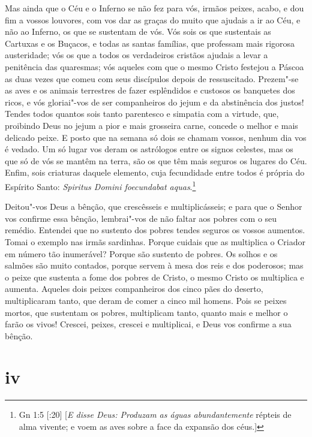 Mas ainda que o Céu e o Inferno se não fez para vós, irmãos peixes,
acabo, e dou fim a vossos louvores, com vos dar as graças do muito que
ajudais a ir ao Céu, e não ao Inferno, os que se sustentam de vós. Vós
sois os que sustentais as Cartuxas e os Buçacos, e todas as santas
famílias, que professam mais rigorosa austeridade; vós os que a todos os
verdadeiros cristãos ajudais a levar a penitência das quaresmas; vós
aqueles com que o mesmo Cristo festejou a Páscoa as duas vezes que comeu
com seus discípulos depois de ressuscitado. Prezem"-se as aves e os
animais terrestres de fazer esplêndidos e custosos os banquetes dos
ricos, e vós gloriai"-vos de ser companheiros do jejum e da abstinência
dos justos! Tendes todos quantos sois tanto parentesco e simpatia com a
virtude, que, proibindo Deus no jejum a pior e mais grosseira carne,
concede o melhor e mais delicado peixe. E posto que na semana só dois se
chamam vossos, nenhum dia vos é vedado. Um só lugar vos deram os
astrólogos entre os signos celestes, mas os que só de vós se mantêm na
terra, são os que têm mais seguros os lugares do Céu. Enfim, sois
criaturas daquele elemento, cuja fecundidade entre todos é própria do
Espírito Santo: \emph{Spiritus Domini foecundabat aquas}.\footnote{Gn 1:5 [:20] [\emph{E disse Deus: Produzam as águas abundantemente} répteis de alma vivente; e voem
as aves sobre a face da expansão dos céus.]}

Deitou"-vos Deus a bênção, que crescêsseis e multiplicásseis; e para que
o Senhor vos confirme essa bênção, lembrai"-vos de não faltar aos pobres
com o seu remédio. Entendei que no sustento dos pobres tendes seguros os
vossos aumentos. Tomai o exemplo nas irmãs sardinhas. Porque cuidais que
as multiplica o Criador em número tão inumerável? Porque são sustento de
pobres. Os solhos e os salmões são muito contados, porque servem à mesa
dos reis e dos poderosos; mas o peixe que sustenta a fome dos pobres de
Cristo, o mesmo Cristo os multiplica e aumenta. Aqueles dois peixes
companheiros dos cinco pães do deserto, multiplicaram tanto, que deram
de comer a cinco mil homens. Pois se peixes mortos, que sustentam os
pobres, multiplicam tanto, quanto mais e melhor o farão os vivos!
Crescei, peixes, crescei e multiplicai, e Deus vos confirme a sua
bênção.

\section*{iv}

